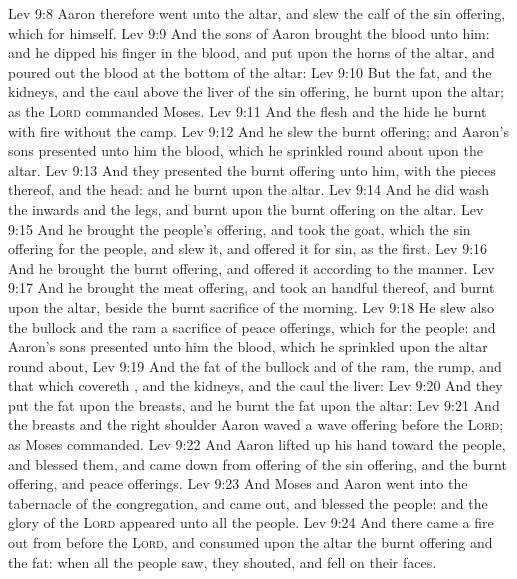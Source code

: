 \vs Lev 9:8 Aaron therefore went unto the altar, and slew the calf of the sin offering, which  for himself.
\vs Lev 9:9 And the sons of Aaron brought the blood unto him: and he dipped his finger in the blood, and put  upon the horns of the altar, and poured out the blood at the bottom of the altar:
\vs Lev 9:10 But the fat, and the kidneys, and the caul above the liver of the sin offering, he burnt upon the altar; as the \textsc{Lord} commanded Moses.
\vs Lev 9:11 And the flesh and the hide he burnt with fire without the camp.
\vs Lev 9:12 And he slew the burnt offering; and Aaron's sons presented unto him the blood, which he sprinkled round about upon the altar.
\vs Lev 9:13 And they presented the burnt offering unto him, with the pieces thereof, and the head: and he burnt  upon the altar.
\vs Lev 9:14 And he did wash the inwards and the legs, and burnt  upon the burnt offering on the altar.
\vs Lev 9:15 And he brought the people's offering, and took the goat, which  the sin offering for the people, and slew it, and offered it for sin, as the first.
\vs Lev 9:16 And he brought the burnt offering, and offered it according to the manner.
\vs Lev 9:17 And he brought the meat offering, and took an handful thereof, and burnt  upon the altar, beside the burnt sacrifice of the morning.
\vs Lev 9:18 He slew also the bullock and the ram  a sacrifice of peace offerings, which  for the people: and Aaron's sons presented unto him the blood, which he sprinkled upon the altar round about,
\vs Lev 9:19 And the fat of the bullock and of the ram, the rump, and that which covereth , and the kidneys, and the caul  the liver:
\vs Lev 9:20 And they put the fat upon the breasts, and he burnt the fat upon the altar:
\vs Lev 9:21 And the breasts and the right shoulder Aaron waved  a wave offering before the \textsc{Lord}; as Moses commanded.
\vs Lev 9:22 And Aaron lifted up his hand toward the people, and blessed them, and came down from offering of the sin offering, and the burnt offering, and peace offerings.
\vs Lev 9:23 And Moses and Aaron went into the tabernacle of the congregation, and came out, and blessed the people: and the glory of the \textsc{Lord} appeared unto all the people.
\vs Lev 9:24 And there came a fire out from before the \textsc{Lord}, and consumed upon the altar the burnt offering and the fat:  when all the people saw, they shouted, and fell on their faces.
